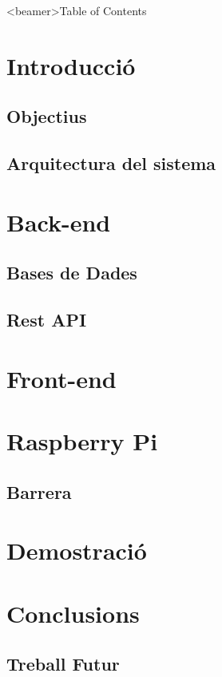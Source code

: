 



\frame{\titlepage}
\begin{frame}<beamer>{Table of Contents}
    \begin{small}
    \tableofcontents[
        subsectionstyle=hide,
    ]
    \end{small}
\end{frame}
\section{Introducció}
\subsection{Objectius}

\subsection{Arquitectura del sistema}

\section{Back-end}
\subsection{Bases de Dades}

\subsection{Rest API}

\section{Front-end}
% 
\section{Raspberry Pi}
\subsection{Barrera}

\section{Demostració}
\section{Conclusions}
\subsection{Treball Futur}

